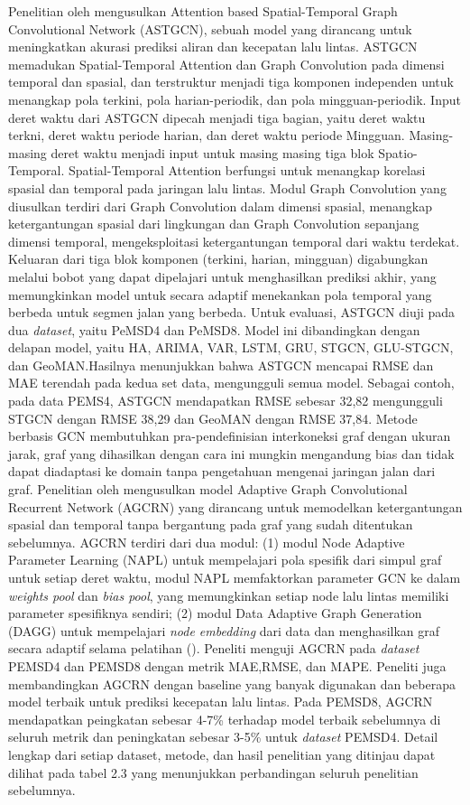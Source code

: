Penelitian oleh \cite{Guo2019} mengusulkan Attention based Spatial-Temporal Graph Convolutional Network (ASTGCN), sebuah model yang dirancang untuk meningkatkan akurasi prediksi aliran dan kecepatan lalu lintas. ASTGCN memadukan Spatial-Temporal Attention dan Graph Convolution pada dimensi temporal dan spasial, dan terstruktur menjadi tiga komponen independen untuk menangkap pola terkini, pola harian-periodik, dan pola mingguan-periodik. Input deret waktu dari ASTGCN dipecah menjadi tiga bagian, yaitu deret waktu terkni, deret waktu periode harian, dan deret waktu periode Mingguan. Masing-masing deret waktu menjadi input untuk masing masing tiga blok Spatio-Temporal. Spatial-Temporal Attention berfungsi untuk menangkap korelasi spasial dan temporal pada jaringan lalu lintas. Modul Graph Convolution yang diusulkan terdiri dari Graph Convolution dalam dimensi spasial, menangkap ketergantungan spasial dari lingkungan dan Graph Convolution sepanjang dimensi temporal, mengeksploitasi ketergantungan temporal dari waktu terdekat. Keluaran dari tiga blok komponen (terkini, harian, mingguan) digabungkan melalui bobot yang dapat dipelajari untuk menghasilkan prediksi akhir, yang memungkinkan model untuk secara adaptif menekankan pola temporal yang berbeda untuk segmen jalan yang berbeda. Untuk evaluasi, ASTGCN diuji pada dua \textit{dataset}, yaitu PeMSD4 dan PeMSD8. Model ini dibandingkan dengan delapan model, yaitu HA, ARIMA, VAR, LSTM, GRU, STGCN, GLU-STGCN, dan GeoMAN.Hasilnya menunjukkan bahwa ASTGCN mencapai RMSE dan MAE terendah pada kedua set data, mengungguli semua model. Sebagai contoh, pada data PEMS4, ASTGCN mendapatkan RMSE sebesar 32,82 mengungguli STGCN dengan RMSE 38,29 dan GeoMAN dengan RMSE 37,84. Metode berbasis GCN membutuhkan pra-pendefinisian interkoneksi graf dengan ukuran jarak, graf yang dihasilkan dengan cara ini mungkin mengandung bias dan tidak dapat diadaptasi ke domain tanpa pengetahuan mengenai jaringan jalan dari graf. Penelitian oleh \cite{Bai2020} mengusulkan model Adaptive Graph Convolutional Recurrent Network (AGCRN) yang dirancang untuk memodelkan ketergantungan spasial dan temporal tanpa bergantung pada graf yang sudah ditentukan sebelumnya. AGCRN terdiri dari dua modul: (1) modul Node Adaptive Parameter Learning (NAPL) untuk mempelajari pola spesifik dari simpul graf untuk setiap deret waktu, modul NAPL memfaktorkan parameter GCN ke dalam \textit{weights pool} dan \textit{bias pool}, yang memungkinkan setiap node lalu lintas memiliki parameter spesifiknya sendiri; (2) modul Data Adaptive Graph Generation (DAGG) untuk mempelajari \textit{node embedding } dari data dan menghasilkan graf secara adaptif selama pelatihan (\cite{Bai2020}). Peneliti menguji AGCRN pada \textit{dataset} PEMSD4 dan PEMSD8 dengan metrik MAE,RMSE, dan MAPE. Peneliti juga membandingkan AGCRN dengan baseline yang banyak digunakan dan beberapa model terbaik untuk prediksi kecepatan lalu lintas. Pada PEMSD8, AGCRN mendapatkan peingkatan sebesar 4-7\% terhadap model terbaik sebelumnya di seluruh metrik dan peningkatan sebesar 3-5\% untuk \textit{dataset} PEMSD4. Detail lengkap dari setiap dataset, metode, dan hasil penelitian yang ditinjau dapat dilihat pada tabel 2.3 yang menunjukkan perbandingan seluruh penelitian sebelumnya.

